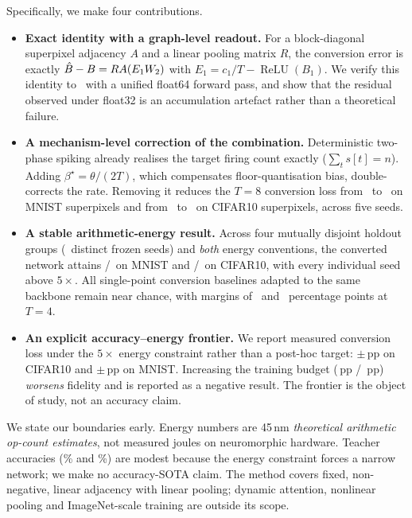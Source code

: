 Specifically, we make four contributions.

\begin{itemize}
\item \textbf{Exact identity with a graph-level readout.} For a block-diagonal superpixel adjacency $A$ and a linear pooling matrix $R$, the conversion error is exactly $\hat{B}-B = R A (E_1 W_2)$ with $E_1 = c_1/T - \operatorname{ReLU}(B_1)$. We verify this identity to \IdentityMax\ with a unified float64 forward pass, and show that the residual observed under float32 is an accumulation artefact rather than a theoretical failure.
\item \textbf{A mechanism-level correction of the combination.} Deterministic two-phase spiking already realises the target firing count exactly ($\sum_t s[t]=n$). Adding $\beta^\star=\theta/(2T)$, which compensates floor-quantisation bias, double-corrects the rate. Removing it reduces the $T{=}8$ conversion loss from \BetaLossVoneM\ to \BetaLossVtwoM\ on MNIST superpixels and from \BetaLossVoneC\ to \BetaLossVtwoC\ on CIFAR10 superpixels, across five seeds.
\item \textbf{A stable arithmetic-energy result.} Across four mutually disjoint holdout groups (\TotalSeeds\ distinct frozen seeds) and \emph{both} energy conventions, the converted network attains \MNISTEp\texttimes/\MNISTEc\texttimes\ on MNIST and \CIFAREp\texttimes/\CIFAREc\texttimes\ on CIFAR10, with every individual seed above $5\times$. All single-point conversion baselines adapted to the same backbone remain near chance, with margins of \MarginMNIST\ and \MarginCIFAR\ percentage points at $T{=}4$.
\item \textbf{An explicit accuracy--energy frontier.} We report measured conversion loss under the $5\times$ energy constraint rather than a post-hoc target: \CIFARLoss$\pm$\CIFARLossStd\,pp on CIFAR10 and \MNISTLoss$\pm$\MNISTLossStd\,pp on MNIST. Increasing the training budget (\EIGHTEENMNISTLoss\,pp / \EIGHTEENCIFARLoss\,pp) \emph{worsens} fidelity and is reported as a negative result. The frontier is the object of study, not an accuracy claim.
\end{itemize}

We state our boundaries early. Energy numbers are 45\,nm \emph{theoretical arithmetic op-count estimates}, not measured joules on neuromorphic hardware. Teacher accuracies (\MNISTAnn\% and \CIFARAnn\%) are modest because the energy constraint forces a narrow network; we make no accuracy-SOTA claim. The method covers fixed, non-negative, linear adjacency with linear pooling; dynamic attention, nonlinear pooling and ImageNet-scale training are outside its scope.

